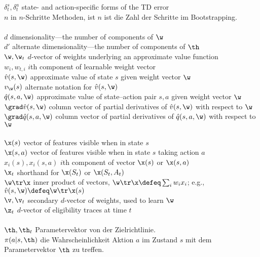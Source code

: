 \documentclass[a4paper,titlepage]{article}
\numberwithin{equation}{section} %
\begin{document}
\>$\delta^s_t, \delta^a_t$ \> state- and action-specific forms of the TD error \\
\>$n$                 \> in $n$-Schritte Methoden, ist $n$ ist die Zahl der Schritte im Bootstrapping.\\
\\
\>$d$                 \> dimensionality---the number of components of $\w$\\
\>$d'$                \> alternate dimensionality---the number of components of $\th$\\
\>$\w,\w_t$           \> $d$-vector of weights underlying an approximate value function\\
\>$w_i,w_{t,i}$ \> $i$th component of learnable weight vector\\
\>$\hat v(s,\w)$      \> approximate value of state $s$ given weight vector $\w$\\
\>$v_\w(s)$           \> alternate notation for $\hat v(s,\w)$\\
\>$\hat q(s,a,\w)$    \> approximate value of state--action pair $s,a$ given weight vector $\w$\\
\>$\grad \hat v(s,\w)$\> column vector of partial derivatives of $\hat v(s,\w)$ with respect to $\w$\\
\>$\grad \hat q(s,a,\w)$\> column vector of partial derivatives of $\hat q(s,a,\w)$ with respect to $\w$\\
\\
\>$\x(s)$             \> vector of features visible when in state $s$\\
\>$\x(s,a)$           \> vector of features visible when in state $s$ taking action $a$\\
\>$x_i(s), x_i(s,a)$  \> $i$th component of vector $\x(s)$ or $\x(s, a)$\\
\>$\x_t$              \> shorthand for $\x(S_t)$ or $\x(S_t,A_t)$\\
\>$\w\tr\x$           \> inner product of vectors, $\w\tr\x\defeq\sum_i w_i x_i$; e.g., $\hat v(s,\w)\defeq\w\tr\x(s)$\\
\>$\v,\v_t$           \> secondary $d$-vector of weights, used to learn $\w$ \\
\>$\z_t$              \> $d$-vector of eligibility traces at time $t$ \\
\\
\>$\th, \th_t$        \> Parametervektor von der Zielrichtlinie. \\
\>$\pi(a|s,\th)$      \> die Wahrscheinlichkeit Aktion $a$ im Zustand $s$ mit dem Parametervektor $\th$ zu treffen.\\
\end{document}
